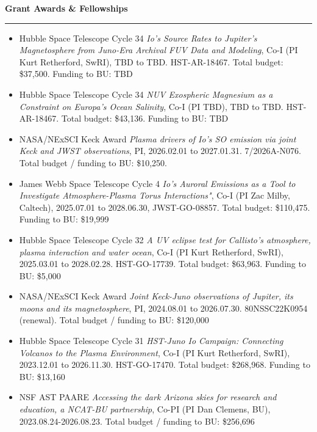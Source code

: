 \documentclass[12pt]{report}
\newcommand{\numitems}[1]{\getrefnumber{#1}}
\begin{document}
\vspace{2 mm}
\noindent\bf{Grant Awards \& Fellowships} \rm\hspace*{\fill} \\
\rule{\textwidth}{1pt}


\begin{itemize} \itemsep -2pt %

\item Hubble Space Telescope Cycle 34 {\it Io's Source Rates to Jupiter's Magnetosphere from Juno-Era Archival FUV Data and Modeling}, Co-I (PI Kurt Retherford, SwRI), TBD to TBD. HST-AR-18467. Total budget: \$37,500. Funding to BU: TBD
\item Hubble Space Telescope Cycle 34 {\it NUV Exospheric Magnesium as a Constraint on Europa's Ocean Salinity}, Co-I (PI TBD), TBD to TBD. HST-AR-18467. Total budget: \$43,136. Funding to BU: TBD
 \item NASA/NExSCI Keck Award {\it Plasma drivers of Io's SO emission via joint Keck and JWST observations}, PI, 2026.02.01 to 2027.01.31. 7/2026A-N076. Total budget / funding to BU: \$10,250.
 \item James Webb Space Telescope Cycle 4 {\it Io's Auroral Emissions as a Tool to Investigate Atmosphere-Plasma Torus Interactions"}, Co-I (PI Zac Milby, Caltech), 2025.07.01 to 2028.06.30, JWST-GO-08857. Total budget: \$110,475. Funding to BU: \$19,999
 \item Hubble Space Telescope Cycle 32 {\it A UV eclipse test for Callisto's atmosphere, plasma interaction and water ocean}, Co-I (PI Kurt Retherford, SwRI), 2025.03.01 to 2028.02.28. HST-GO-17739. Total budget: \$63,963. Funding to BU: \$5,000
 \item NASA/NExSCI Keck Award {\it Joint Keck-Juno observations of Jupiter, its moons and its magnetosphere}, PI, 2024.08.01 to 2026.07.30. 80NSSC22K0954 (renewal). Total budget / funding to BU: \$120,000
 \item Hubble Space Telescope Cycle 31 {\it HST-Juno Io Campaign: Connecting Volcanos to the Plasma Environment}, Co-I (PI Kurt Retherford, SwRI), 2023.12.01 to 2026.11.30. HST-GO-17470. Total budget: \$268,968. Funding to BU: \$13,160
 \item NSF AST PAARE {\it Accessing the dark Arizona skies for research and education, a NCAT-BU partnership}, Co-PI (PI Dan Clemens, BU), 2023.08.24-2026.08.23. Total budget / funding to BU: \$256,696

\end{itemize}
\end{document}
